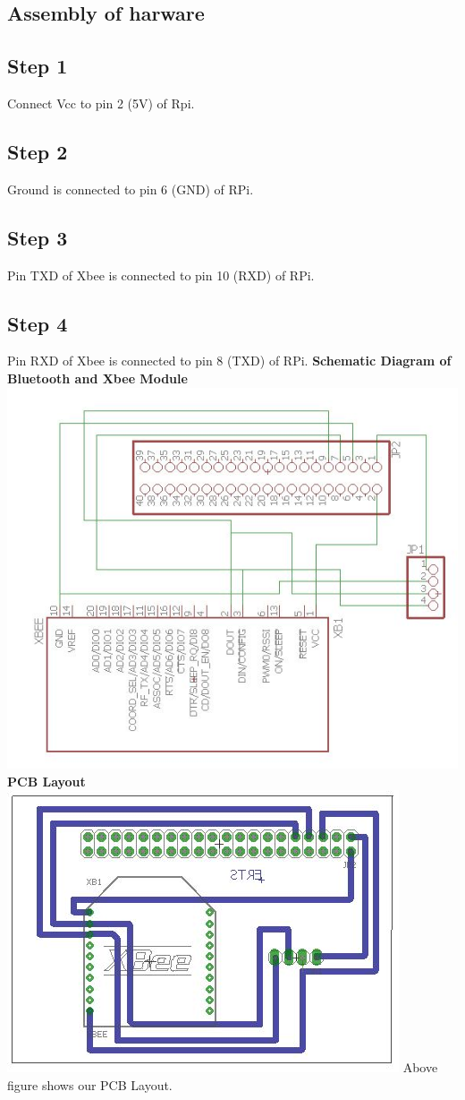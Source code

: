 \documentclass[a4paper,12pt,oneside]{book}
\begin{document}
\subsection*{Assembly of harware}
\subsection*{Step 1}
Connect Vcc to pin 2 (5V) of Rpi.
\subsection*{Step 2}
Ground is connected to pin 6 (GND) of RPi.
\subsection*{Step 3}
Pin TXD of Xbee is connected to pin 10 (RXD) of RPi.
\subsection*{Step 4}
Pin RXD of Xbee is connected to pin 8 (TXD) of RPi.
\textbf{Schematic Diagram of Bluetooth and Xbee Module}\\
\centering
\includegraphics[scale= 0.8]{zigbee_schematic}
\flushleft
\textbf{PCB Layout}\\
\centering
\includegraphics[scale= 0.5]{zigbee_layout}
\flushleft
Above figure shows our PCB Layout.
\end{document}
